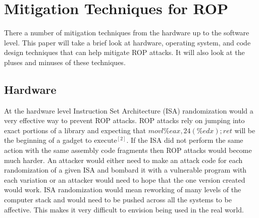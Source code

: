 \documentclass[11pt]{amsart}
\begin{document}
\section*{Mitigation Techniques for ROP}
There a number of mitigation techniques from the hardware up to the software level. This paper will take a brief look at hardware, operating system, and code design techniques that can help mitigate ROP attacks. It will also look at the pluses and minuses of these techniques.
\subsection*{Hardware}
At the hardware level Instruction Set Architecture (ISA) randomization would a very effective way to prevent ROP attacks. ROP attacks rely on jumping into exact portions of a library and expecting that $movl \%eax, 24(\%edx); ret$ will be the beginning of a gadget to $\text{execute}^{[2]}$. If the ISA did not perform the same action with the same assembly code fragments then ROP attacks would become much harder. An attacker would either need to make an attack code for each randomization of a given ISA and bombard it with a vulnerable program with each variation or an attacker would need to hope that the one version created would work. ISA randomization would mean reworking of many levels of the computer stack and would need to be pushed across all the systems to be affective. This makes it very difficult to envision being used in the real world.
\end{document}
